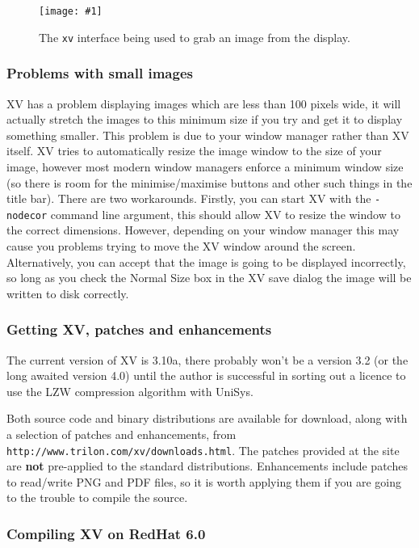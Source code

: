 \documentclass[twoside,11pt]{article}
\newcommand{\htmladdnormallink}[2]{#1}
\newcommand{\htmladdimg}[1]{}
\newcommand{\htmlref}[2]{#1}
\newcommand{\latex}[1]{#1}
\newcommand{\myfig} [5] {
  \begin{figure}
    \centering\texttt{[image: \#1]}
    \typeout{#1 inserted on page \arabic{page}}
    \caption{\label{#4}#5}
  \end{figure}
  }
\newcommand{\myfig}[5]{
    \label{#4} \htmladdimg{#3}\\
    Figure: #5\\
    }
\begin{document}
\myfig{sc15_xv_capture.eps}{height=0.4\textheight}{sc15_xv_capture.gif}{sc15_xv_capture}{The {\tt xv} interface being used to grab an image from the display.}

\subsubsection{Problems with small images}

XV has a problem displaying images which are less than 100 pixels wide, it will actually stretch the images to this minimum size if you try and get it to display something smaller. This problem is due to your window manager rather than XV itself. XV tries to automatically resize the image window to the size of your image, however most modern window managers enforce a minimum window size (so there is room for the minimise/maximise buttons and other such things in the title bar). There are two workarounds. Firstly, you can start XV with the {\tt -nodecor} command line argument, this should allow XV to resize the window to the correct dimensions. However, depending on your window manager this may cause you problems trying to move the XV window around the screen. Alternatively, you can accept that the image is going to be displayed incorrectly, so long as you check the {\sc Normal Size} box in the XV save dialog the image will be written to disk correctly.

\subsubsection{Getting XV, patches and enhancements}

The current version of XV is 3.10a, there probably won't be a version 3.2 (or the long awaited version 4.0) until the author is successful in sorting out a \htmlref{licence}{sc15_giflegal} to use the LZW compression algorithm with UniSys.

Both source code and binary distributions are available for \htmladdnormallink{download}{http://www.trilon.com/xv/downloads.html}, along with a selection of patches and enhancements\latex{, from {\tt http://www.trilon.com/xv/downloads.html}}. The patches provided at the site are {\bf not} pre-applied to the standard distributions. Enhancements include patches to read/write PNG and PDF files, so it is worth applying them if you are going to the trouble to compile the source.

\subsubsection{Compiling XV on RedHat 6.0}
\end{document}
